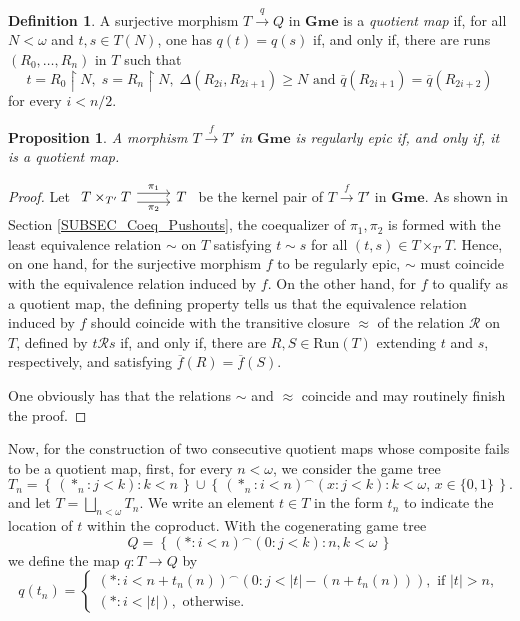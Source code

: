 \documentclass[12pt]{amsart}
\newtheorem{prop}[thm]{Proposition}
\theoremstyle{definition}
\newtheorem{defn}[thm]{Definition}
\newcommand{\set}[1]{\left\{\, {#1} \,\right\}}
\newcommand{\seq}[1]{{\left( {#1} \right)}}
\newcommand{\Run}{{\mathrm{Run}}}
\DeclareMathOperator{\restrict}{\upharpoonright}
\newcommand{\Gmes}{\mathbf{Gme}}
\begin{document}
\begin{defn}
	A surjective morphism $T\stackrel{q}{\to}Q$ in $\Gmes$ is a {\em quotient map} if, for all $N<\omega$ and $t,s\in T(N)$, one has $q(t)=q(s)$ if, and only if, there are runs $\seq{R_0, \dotsc, R_n}$ in $T$ such that
	\[
	t=R_0\restrict N, \; s = R_n\restrict N, \; \Delta(R_{2i}, R_{2i+1})\ge N \text{  and  } \overline{q}(R_{2i+1}) = \overline{q}(R_{2i+2})
	\]
	for every $i < n/2$.
\end{defn}


\begin{prop}\label{PROP_Gme_RegEpis}
	A morphism $T\stackrel{f}{\to}T'$ in $\Gmes$ is regularly epic if, and only if, it is a quotient map.
\end{prop}
\begin{proof}
	Let $\begin{tikzcd}
		T\times_{T'} T \arrow[r,shift left=.75ex,"\pi_1"] \arrow[r,shift right=.75ex,"\pi_2"{below}]  &
		T
	\end{tikzcd}$  be the kernel pair of $T\stackrel{f}{\to} T'$ in $\Gmes$. 
	As shown in Section \ref{SUBSEC_Coeq_Pushouts}, the coequalizer 
	of  $\pi_1,\pi_2$ is formed with 
	the least equivalence relation $\sim$ on $T$ satisfying $t\sim s$ for all $(t,s)\in T\times_{T'} T$. 
	Hence, on one hand, for the surjective morphism $f$ to be regularly epic, $\sim$ must coincide with the equivalence relation induced by $f$.	
	On the other hand, for $f$ to qualify as a quotient map, the defining property tells us that the equivalence relation induced by $f$ should coincide with the transitive closure $\approx$ of the relation $\mathcal R$ on $T$, defined by $t\mathcal R s$ if, and only if, there are $R,S\in \Run(T)$ extending $t$ and $s$, respectively, and satisfying $\overline{f}(R)=\overline{f}(S)$. 
	
	One obviously has that the relations $\sim$ and $\approx$ coincide and may routinely finish the proof.
\end{proof}

Now, for the construction of two consecutive quotient maps whose composite fails to be a quotient map, first, for every $n<\omega$, we consider the game tree
\[
T_n = \set{\seq{*_n:j<k}:k<n} \cup \set{\seq{*_n:i<n}^\smallfrown \seq{x:j<k}:k<\omega,\, x\in \{0,1\} }.
\]
and let $T = \bigsqcup_{n<\omega} T_n$. We write an element $t\in T$ in the form $t_n$ to indicate the location of $t$ within the coproduct.
With the cogenerating game tree
\[
Q = \set{\seq{\ast:i<n}^\smallfrown \seq{0:j<k}: n,k<\omega}
\]
we define the map $q\colon T\to Q$ by
\[
q(t_n) = \begin{cases}
	\seq{\ast: i<n+t_n(n)}^\smallfrown\seq{0: j<|t|-(n+t_n(n))}, \text{ if $|t|>n$},\\
	\seq{\ast:i<|t|}, \text{ otherwise.}
\end{cases}
\]
\end{document}
